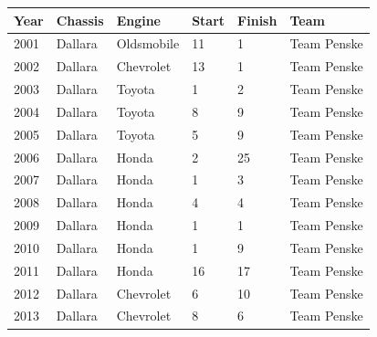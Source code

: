 \documentclass{article}
\begin{document}
\begin{tabular}{llllll}
\toprule
Year & Chassis & Engine & Start & Finish & Team \\
\midrule
2001 & Dallara & Oldsmobile & 11 & 1 & Team Penske \\
2002 & Dallara & Chevrolet & 13 & 1 & Team Penske \\
2003 & Dallara & Toyota & 1 & 2 & Team Penske \\
2004 & Dallara & Toyota & 8 & 9 & Team Penske \\
2005 & Dallara & Toyota & 5 & 9 & Team Penske \\
2006 & Dallara & Honda & 2 & 25 & Team Penske \\
2007 & Dallara & Honda & 1 & 3 & Team Penske \\
2008 & Dallara & Honda & 4 & 4 & Team Penske \\
2009 & Dallara & Honda & 1 & 1 & Team Penske \\
2010 & Dallara & Honda & 1 & 9 & Team Penske \\
2011 & Dallara & Honda & 16 & 17 & Team Penske \\
2012 & Dallara & Chevrolet & 6 & 10 & Team Penske \\
2013 & Dallara & Chevrolet & 8 & 6 & Team Penske \\
\bottomrule
\end{tabular}
\end{document}
